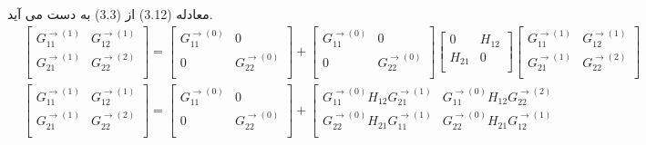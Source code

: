 معادله (3.12) از (3.3) به دست می آید.
\begin{equation}
    \begin{split}
          & \left[ \begin{matrix}
           G_{11}^{\to (1)} & G_{12}^{\to (1)}  \\
           G_{21}^{\to (1)} & G_{22}^{\to (2)}  \\
        \end{matrix} \right]=\left[ \begin{matrix}
           G_{11}^{\to (0)} & 0  \\
           0 & G_{22}^{\to (0)}  \\
        \end{matrix} \right]+\left[ \begin{matrix}
           G_{11}^{\to (0)} & 0  \\
           0 & G_{22}^{\to (0)}  \\
        \end{matrix} \right]\left[ \begin{matrix}
           0 & {{H}_{12}}  \\
           {{H}_{21}} & 0  \\
        \end{matrix} \right]\left[ \begin{matrix}
           G_{11}^{\to (1)} & G_{12}^{\to (1)}  \\
           G_{21}^{\to (1)} & G_{22}^{\to (2)}  \\
        \end{matrix} \right] \\ 
         & \left[ \begin{matrix}
           G_{11}^{\to (1)} & G_{12}^{\to (1)}  \\
           G_{21}^{\to (1)} & G_{22}^{\to (2)}  \\
        \end{matrix} \right]=\left[ \begin{matrix}
           G_{11}^{\to (0)} & 0  \\
           0 & G_{22}^{\to (0)}  \\
        \end{matrix} \right]+\left[ \begin{matrix}
           G_{11}^{\to (0)}{{H}_{12}}G_{21}^{\to (1)} & G_{11}^{\to (0)}{{H}_{12}}G_{22}^{\to (2)}  \\
           G_{22}^{\to (0)}{{H}_{21}}G_{11}^{\to (1)} & G_{22}^{\to (0)}{{H}_{21}}G_{12}^{\to (1)}  \\

\end{matrix}
\end{split}
\end{equation}
